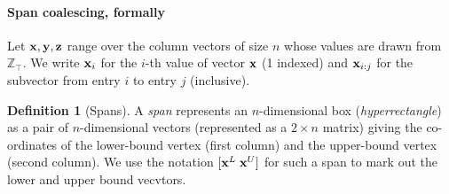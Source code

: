 \documentclass[9pt]{sigplanconf}
\newcounter{block}
\theoremstyle{definition}
\newtheorem{definition}[block]{Definition}
\begin{document}
\paragraph{Span coalescing, formally}

Let $\textbf{x}, \textbf{y}, \textbf{z}$ range over the column vectors of size
$n$ whose values are drawn from $\mathbb{Z}_\top$.
We write $\textbf{x}_i$ for the $i$-th value of vector $\textbf{x}$ (1
indexed) and $\textbf{x}_{i:j}$ for the subvector from entry $i$ to
entry $j$ (inclusive). 

\begin{definition}[Spans]
  A \emph{span} represents an $n$-dimensional box (\emph{hyperrectangle}) as
  a pair of $n$-dimensional vectors (represented as a $2 \times n$
  matrix) giving the co-ordinates of the lower-bound vertex (first
  column) and the upper-bound vertex (second column). We use the
  notation $[\textbf{x}^L \; \textbf{x}^U]$ for such a span to mark out
  the lower and upper bound vecvtors. 
\end{definition}
\end{document}
